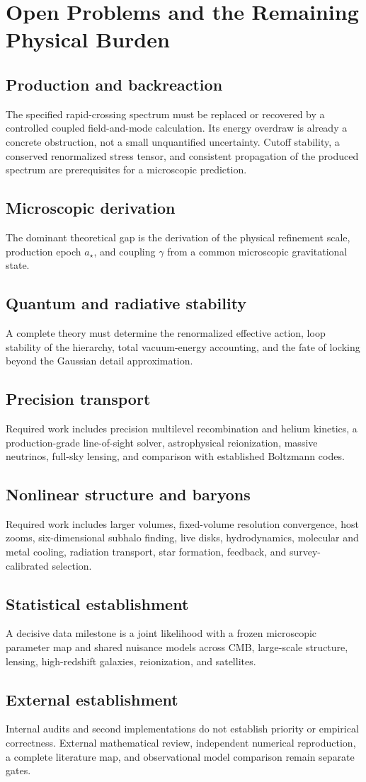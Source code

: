\chapter{Open Problems and the Remaining Physical Burden}\label{ch:open-problems}
\section{Production and backreaction}
The specified rapid-crossing spectrum must be replaced or recovered by a controlled coupled field-and-mode calculation. Its energy overdraw is already a concrete obstruction, not a small unquantified uncertainty. Cutoff stability, a conserved renormalized stress tensor, and consistent propagation of the produced spectrum are prerequisites for a microscopic prediction.
\section{Microscopic derivation}
The dominant theoretical gap is the derivation of the physical refinement scale, production epoch $a_\star$, and coupling $\gamma$ from a common microscopic gravitational state.
\section{Quantum and radiative stability}
A complete theory must determine the renormalized effective action, loop stability of the hierarchy, total vacuum-energy accounting, and the fate of locking beyond the Gaussian detail approximation.
\section{Precision transport}
Required work includes precision multilevel recombination and helium kinetics, a production-grade line-of-sight solver, astrophysical reionization, massive neutrinos, full-sky lensing, and comparison with established Boltzmann codes.
\clearpage
\section{Nonlinear structure and baryons}
Required work includes larger volumes, fixed-volume resolution convergence, host zooms, six-dimensional subhalo finding, live disks, hydrodynamics, molecular and metal cooling, radiation transport, star formation, feedback, and survey-calibrated selection.
\section{Statistical establishment}
A decisive data milestone is a joint likelihood with a frozen microscopic parameter map and shared nuisance models across CMB, large-scale structure, lensing, high-redshift galaxies, reionization, and satellites.
\section{External establishment}
Internal audits and second implementations do not establish priority or empirical correctness. External mathematical review, independent numerical reproduction, a complete literature map, and observational model comparison remain separate gates.
